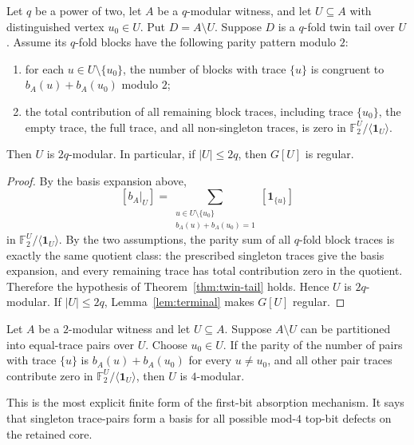 \documentclass[thmsec,dntnbr,nolinenbrs]{dmgt}
\numberwithin{equation}{section}
\newcommand{\F}{\mathbb{F}}
\newcommand{\one}{\mathbf{1}}
\begin{document}
\begin{theorem}\label{thm:basis-tail}
Let \(q\) be a power of two, let \(A\) be a \(q\)-modular witness, and let \(U\subseteq A\) with distinguished vertex \(u_0\in U\).  Put \(D=A\setminus U\).  Suppose \(D\) is a \(q\)-fold twin tail over \(U\).  Assume its \(q\)-fold blocks have the following parity pattern modulo \(2\):
\begin{enumerate}[label=\textup{(\arabic*)}, leftmargin=*]
    \item for each \(u\in U\setminus\{u_0\}\), the number of blocks with trace \(\{u\}\) is congruent to \(b_A(u)+b_A(u_0)\) modulo \(2\);
    \item the total contribution of all remaining block traces, including trace \(\{u_0\}\), the empty trace, the full trace, and all non-singleton traces, is zero in \(\F_2^U/\langle \one_U\rangle\).
\end{enumerate}
Then \(U\) is \(2q\)-modular.  In particular, if \(|U|\le 2q\), then \(G[U]\) is regular.
\end{theorem}

\begin{proof}
By the basis expansion above,
\[
        [b_A|_U]
        =\sum_{\substack{u\in U\setminus\{u_0\}\\ b_A(u)+b_A(u_0)=1}}[\one_{\{u\}}]
\]
in \(\F_2^U/\langle \one_U\rangle\).  By the two assumptions, the parity sum of all \(q\)-fold block traces is exactly the same quotient class: the prescribed singleton traces give the basis expansion, and every remaining trace has total contribution zero in the quotient.  Therefore the hypothesis of Theorem~\ref{thm:twin-tail} holds.  Hence \(U\) is \(2q\)-modular.  If \(|U|\le 2q\), Lemma~\ref{lem:terminal} makes \(G[U]\) regular.
\end{proof}

\begin{corollary}\label{cor:first-bit-basis}
Let \(A\) be a \(2\)-modular witness and let \(U\subseteq A\).  Suppose \(A\setminus U\) can be partitioned into equal-trace pairs over \(U\).  Choose \(u_0\in U\).  If the parity of the number of pairs with trace \(\{u\}\) is \(b_A(u)+b_A(u_0)\) for every \(u\ne u_0\), and all other pair traces contribute zero in \(\F_2^U/\langle \one_U\rangle\), then \(U\) is \(4\)-modular.
\end{corollary}

This is the most explicit finite form of the first-bit absorption mechanism.  It says that singleton trace-pairs form a basis for all possible mod-\(4\) top-bit defects on the retained core.
\end{document}
